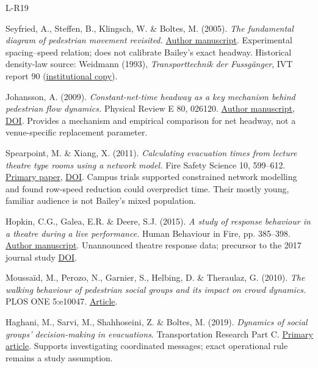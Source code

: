 \documentclass[11pt,a4paper]{article}
\begin{document}
\clearpage
\begin{thebibliography}{L-R19}
 Seyfried, A., Steffen, B., Klingsch, W. \& Boltes, M. (2005). \emph{The fundamental diagram of pedestrian movement revisited.} \href{https://arxiv.org/abs/physics/0506170}{Author manuscript}. Experimental spacing–speed relation; does not calibrate Bailey's exact headway. Historical density-law source: Weidmann (1993), \emph{Transporttechnik der Fussgänger}, IVT report 90 (\href{https://asim.uni-wuppertal.de/fileadmin/bauing/asim/Datenbank/Data_from_literature/Fundamental_Diagrams/weidmann-1993_01.pdf}{institutional copy}).

 Johansson, A. (2009). \emph{Constant-net-time headway as a key mechanism behind pedestrian flow dynamics.} Physical Review E 80, 026120. \href{https://arxiv.org/pdf/0908.3118}{Author manuscript}, \href{https://doi.org/10.1103/PhysRevE.80.026120}{DOI}. Provides a mechanism and empirical comparison for net headway, not a venue-specific replacement parameter.

 Spearpoint, M. \& Xiang, X. (2011). \emph{Calculating evacuation times from lecture theatre type rooms using a network model.} Fire Safety Science 10, 599–612. \href{https://publications.iafss.org/publications/fss/10/599/view}{Primary paper}, \href{https://doi.org/10.3801/IAFSS.FSS.10-599}{DOI}. Campus trials supported constrained network modelling and found row-speed reduction could overpredict time. Their mostly young, familiar audience is not Bailey's mixed population.

 Hopkin, C.G., Galea, E.R. \& Deere, S.J. (2015). \emph{A study of response behaviour in a theatre during a live performance.} Human Behaviour in Fire, pp. 385–398. \href{https://gala.gre.ac.uk/id/eprint/14359/1/14359_GALEA_Response_Behaviour_in_a_Theatre_2015.pdf}{Author manuscript}. Unannounced theatre response data; precursor to the 2017 journal study \href{https://doi.org/10.1002/fam.2424}{DOI}.

 Moussaïd, M., Perozo, N., Garnier, S., Helbing, D. \& Theraulaz, G. (2010). \emph{The walking behaviour of pedestrian social groups and its impact on crowd dynamics.} PLOS ONE 5:e10047. \href{https://doi.org/10.1371/journal.pone.0010047}{Article}.

 Haghani, M., Sarvi, M., Shahhoseini, Z. \& Boltes, M. (2019). \emph{Dynamics of social groups' decision-making in evacuations}. Transportation Research Part C. \href{https://www.sciencedirect.com/science/article/pii/S0968090X18307009}{Primary article}. Supports investigating coordinated messages; exact operational rule remains a study assumption.


\end{thebibliography}
\end{document}
